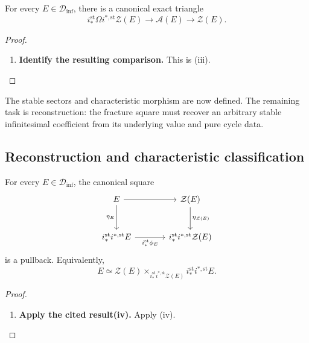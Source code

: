 \begin{theorem}
\label{thm:stable-bnv-upper-triangle}
For every \(E\in\mathcal D_{\inf}\), there is a canonical exact triangle
\[
\boxed{
    i_*^{\mathrm{st}}\Omega i^{*,\mathrm{st}}\mathcal Z(E)
    \longrightarrow
    \mathcal A(E)
    \longrightarrow
    \mathcal Z(E).
}
\]
\end{theorem}

\begin{proof}
\leavevmode
\begin{enumerate}[label=\textup{(\arabic*)}]
    \item \textbf{Identify the resulting comparison.}
    This is \textup{(iii)}.
\end{enumerate}
\end{proof}
The stable sectors and characteristic morphism are now defined. The remaining
task is reconstruction: the fracture square must recover an arbitrary stable
infinitesimal coefficient from its underlying value and pure cycle data.

\subsection{Reconstruction and characteristic classification}

\begin{theorem}
\label{thm:stable-bnv-reconstruction}
For every \(E\in\mathcal D_{\inf}\), the canonical square
\[
\begin{tikzcd}[column sep=large,row sep=large]
    E \arrow[r] \arrow[d,"\eta_E"']
        & \mathcal Z(E) \arrow[d,"\eta_{\mathcal Z(E)}"]
    \\
    i_*^{\mathrm{st}}i^{*,\mathrm{st}}E
        \arrow[r,"i_*^{\mathrm{st}}\phi_E"']
        & i_*^{\mathrm{st}}i^{*,\mathrm{st}}\mathcal Z(E)
\end{tikzcd}
\]
is a pullback. Equivalently,
\[
\boxed{
    E
    \simeq
    \mathcal Z(E)
    \times_{i_*^{\mathrm{st}}i^{*,\mathrm{st}}\mathcal Z(E)}
    i_*^{\mathrm{st}}i^{*,\mathrm{st}}E.
}
\]
\end{theorem}

\begin{proof}
\leavevmode
\begin{enumerate}[label=\textup{(\arabic*)}]
    \item \textbf{Apply the cited result(iv).}
    Apply \textup{(iv)}.
\end{enumerate}
\end{proof}

